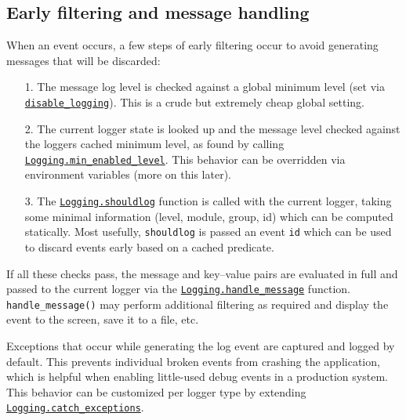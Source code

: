 \hypertarget{6918254684898348274}{}


\subsection{Early filtering and message handling}



When an event occurs, a few steps of early filtering occur to avoid generating messages that will be discarded:



\begin{itemize}
\item[1. ] The message log level is checked against a global minimum level (set via \hyperlink{10677278458507378523}{\texttt{disable\_logging}}).  This is a crude but extremely cheap global setting.


\item[2. ] The current logger state is looked up and the message level checked against the logger{\textquotesingle}s cached minimum level, as found by calling \hyperlink{1177702033979282781}{\texttt{Logging.min\_enabled\_level}}. This behavior can be overridden via environment variables (more on this later).


\item[3. ] The \hyperlink{10642364941499317938}{\texttt{Logging.shouldlog}} function is called with the current logger, taking some minimal information (level, module, group, id) which can be computed statically.  Most usefully, \texttt{shouldlog} is passed an event \texttt{id} which can be used to discard events early based on a cached predicate.

\end{itemize}


If all these checks pass, the message and key–value pairs are evaluated in full and passed to the current logger via the \hyperlink{1528450952930149457}{\texttt{Logging.handle\_message}} function. \texttt{handle\_message()} may perform additional filtering as required and display the event to the screen, save it to a file, etc.



Exceptions that occur while generating the log event are captured and logged by default.  This prevents individual broken events from crashing the application, which is helpful when enabling little-used debug events in a production system.  This behavior can be customized per logger type by extending \hyperlink{13546483368377724892}{\texttt{Logging.catch\_exceptions}}.




